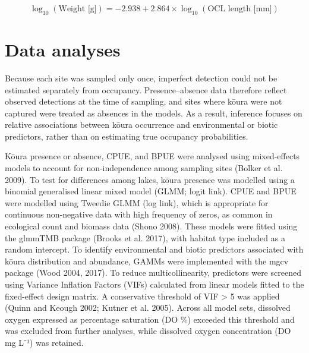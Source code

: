 \documentclass[
  12pt,
  a4paper,
]{scrbook}
\begin{document}
\[
\log_{10}(\text{Weight [g]}) = -2.938 + 2.864 \times \log_{10}(\text{OCL length [mm]})
\]

\section{Data analyses}\label{data-analyses}

Because each site was sampled only once, imperfect detection could not
be estimated separately from occupancy. Presence--absence data therefore
reflect observed detections at the time of sampling, and sites where
kōura were not captured were treated as absences in the models. As a
result, inference focuses on relative associations between kōura
occurrence and environmental or biotic predictors, rather than on
estimating true occupancy probabilities.

Kōura presence or absence, CPUE, and BPUE were analysed using
mixed-effects models to account for non-independence among sampling
sites (Bolker et al. 2009). To test for differences among lakes, kōura
presence was modelled using a binomial generalised linear mixed model
(GLMM; logit link). CPUE and BPUE were modelled using Tweedie GLMM (log
link), which is appropriate for continuous non-negative data with high
frequency of zeros, as common in ecological count and biomass data
(Shono 2008). These models were fitted using the glmmTMB package (Brooks
et al. 2017), with habitat type included as a random intercept. To
identify environmental and biotic predictors associated with kōura
distribution and abundance, GAMMs were implemented with the mgcv package
(Wood 2004, 2017). To reduce multicollinearity, predictors were screened
using Variance Inflation Factors (VIFs) calculated from linear models
fitted to the fixed-effect design matrix. A conservative threshold of
VIF \textgreater{} 5 was applied (Quinn and Keough 2002; Kutner et al.
2005). Across all model sets, dissolved oxygen expressed as percentage
saturation (DO \%) exceeded this threshold and was excluded from further
analyses, while dissolved oxygen concentration (DO mg L⁻¹) was retained.
\end{document}
